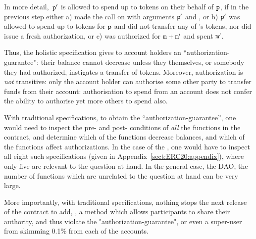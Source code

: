 In more detail,\  ${\mbox{\tt{p}}}'$ is allowed to spend 
up to  tokens on their behalf of ${\mbox{\tt{p}}}$, if in the   previous step either a)
  made the call  on  
with arguments ${\mbox{\tt{p}}}'$ and , or b)  
${\mbox{\tt{p}}}'$ was allowed to spend  up to  tokens for ${\mbox{\tt{p}}}$
and did not transfer any of 's tokens, nor did  issue a fresh authorization,
or c)  was authorized for ${\mbox{\tt{m}}}+{\mbox{\tt{m}}}'$ and spent ${\mbox{\tt{m}}}'$. 
  
  \vspace{.1cm}
 
 Thus, the holistic specification gives to account holders an
 ``authorization-guarantee'': their balance cannot decrease unless they
 themselves, or somebody they had authorized, instigates a transfer of
 tokens. Moreover, authorization is {\em not} transitive: only the
 account holder can authorise some other party to transfer funds from
 their account: authorisation to spend from an account does not confer
 the ability to authorise yet more others to spend also.
 
 
 With traditional  specifications, to obtain the ``authorization-guarantee'', 
one would need to inspect the pre- and post- conditions of {\em all} the functions
in the contract, and determine which of the functions decrease balances, and which of the functions 
 affect authorizations.
 In the case of the , one would have to inspect all eight such specifications
 (given in Appendix~\ref{sect:ERC20:appendix}), 
 where only five are relevant to the question at hand.
 In the general case, \eg the DAO, the number of   functions which are unrelated
 to the question at hand can be very large.
  
More importantly, with traditional  specifications, nothing stops the next release of the contract to add, 
\eg, a method which allows participants to share their authority, and thus
violate the "authorization-guarantee", or even a super-user from skimming 0.1\% from each of the accounts.

